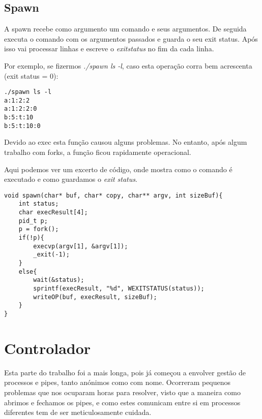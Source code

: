 \documentclass{article}
\begin{document}
\subsection{Spawn}
A spawn recebe como argumento um comando e seus argumentos. De seguida executa o comando com os argumentos passados e guarda o seu exit status. Após isso vai processar linhas e escreve o \emph{exitstatus} no fim da cada linha.
\par Por exemplo, se fizermos \emph{./spawn ls -l}, caso esta operação corra bem acrescenta (exit status = 0):
\begin{lstlisting}
./spawn ls -l
a:1:2:2
a:1:2:2:0
b:5:t:10
b:5:t:10:0
\end{lstlisting}
\par Devido ao exec esta função causou alguns problemas. No entanto, após algum trabalho com forks, a função ficou rapidamente operacional.
\par Aqui podemos ver um excerto de código, onde mostra como o comando é executado e como guardamos o \emph{exit status}.
\begin{lstlisting}
void spawn(char* buf, char* copy, char** argv, int sizeBuf){
    int status;
    char execResult[4];
    pid_t p;
    p = fork();
    if(!p){
        execvp(argv[1], &argv[1]);
        _exit(-1);
    }
    else{
        wait(&status);
        sprintf(execResult, "%d", WEXITSTATUS(status));
        writeOP(buf, execResult, sizeBuf);
    }
}
\end{lstlisting}

\clearpage

\section{Controlador}
\par Esta parte do trabalho foi a mais longa, pois já começou a envolver gestão de processos e pipes, tanto anónimos como com nome. Ocorreram pequenos problemas que nos ocuparam horas para resolver, visto que a maneira como abrimos e fechamos os pipes, e como estes comunicam entre si em processos diferentes tem de ser meticulosamente cuidada.
\end{document}
